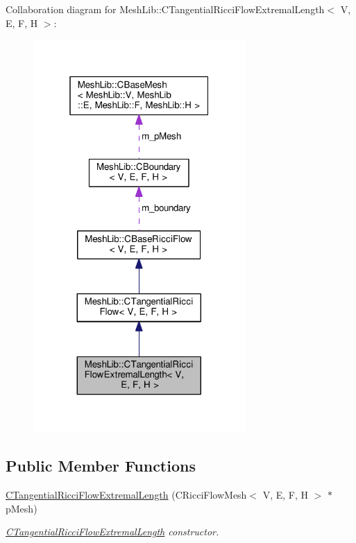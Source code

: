 Collaboration diagram for Mesh\+Lib\+:\+:C\+Tangential\+Ricci\+Flow\+Extremal\+Length$<$ V, E, F, H $>$\+:
\nopagebreak
\begin{figure}[H]
\begin{center}
\leavevmode
\includegraphics[width=229pt]{class_mesh_lib_1_1_c_tangential_ricci_flow_extremal_length__coll__graph}
\end{center}
\end{figure}
\subsection*{Public Member Functions}
\begin{DoxyCompactItemize}
\item 
\hyperlink{class_mesh_lib_1_1_c_tangential_ricci_flow_extremal_length_adf9a193473c13c08bb9d6644e4d3c729}{C\+Tangential\+Ricci\+Flow\+Extremal\+Length} (C\+Ricci\+Flow\+Mesh$<$ V, E, F, H $>$ $\ast$p\+Mesh)
\begin{DoxyCompactList}\small\item\em \hyperlink{class_mesh_lib_1_1_c_tangential_ricci_flow_extremal_length}{C\+Tangential\+Ricci\+Flow\+Extremal\+Length} constructor. \end{DoxyCompactList}\end{DoxyCompactItemize}
